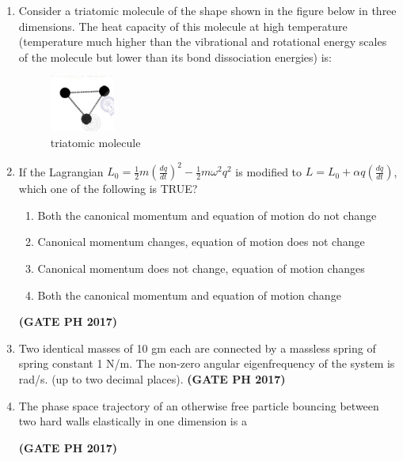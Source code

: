 \documentclass[14pt, a4paper]{extarticle}
\begin{document}
\begin{enumerate}[label=\textbf{Q.\arabic*}]
\item Consider a triatomic molecule of the shape shown in the figure below in three dimensions. The heat capacity of this molecule at high temperature (temperature much higher than the vibrational and rotational energy scales of the molecule but lower than its bond dissociation energies) is:
\begin{figure}[H]
\centering
\includegraphics[width=0.2\textwidth]{figs/q9fig17.png}
\caption{triatomic molecule }
\label{fig:triatomic}
\end{figure}
\begin{enumerate}
\end{enumerate}

\item If the Lagrangian $L_0 = \frac{1}{2} m \left(\frac{dq}{dt}\right)^2 - \frac{1}{2} m \omega^2 q^2$ is modified to $L = L_0 + \alpha q \left(\frac{dq}{dt}\right)$, which one of the following is TRUE?
\begin{enumerate}
\item Both the canonical momentum and equation of motion do not change
\item Canonical momentum changes, equation of motion does not change
\item Canonical momentum does not change, equation of motion changes
\item Both the canonical momentum and equation of motion change
\end{enumerate}
\hfill \textbf{(GATE PH 2017)}

\item Two identical masses of 10 gm each are connected by a massless spring of spring constant 1 N/m. The non-zero angular eigenfrequency of the system is \underline{\hspace{3cm}} rad/s. (up to two decimal places).
\hfill \textbf{(GATE PH 2017)}

\item The phase space trajectory of an otherwise free particle bouncing between two hard walls elastically in one dimension is a
\begin{enumerate}
\end{enumerate}
\hfill \textbf{(GATE PH 2017)}


\end{enumerate}
\end{document}
